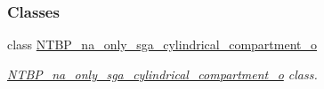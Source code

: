 \subsubsection*{Classes}
\begin{DoxyCompactItemize}
\item 
class \hyperlink{class_n_t_b_p__na__only__sga__cylindrical__compartment__o}{NTBP\_\-na\_\-only\_\-sga\_\-cylindrical\_\-compartment\_\-o}
\begin{DoxyCompactList}\small\item\em \hyperlink{class_n_t_b_p__na__only__sga__cylindrical__compartment__o}{NTBP\_\-na\_\-only\_\-sga\_\-cylindrical\_\-compartment\_\-o} class. \item\end{DoxyCompactList}\end{DoxyCompactItemize}
